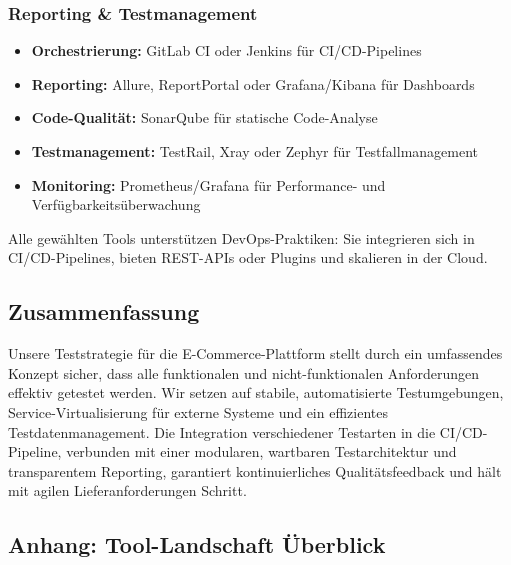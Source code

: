 \subsubsection{Reporting \& Testmanagement}
\begin{itemize}
    \item \textbf{Orchestrierung:} GitLab CI oder Jenkins für CI/CD-Pipelines
    \item \textbf{Reporting:} Allure, ReportPortal oder Grafana/Kibana für Dashboards
    \item \textbf{Code-Qualität:} SonarQube für statische Code-Analyse
    \item \textbf{Testmanagement:} TestRail, Xray oder Zephyr für Testfallmanagement
    \item \textbf{Monitoring:} Prometheus/Grafana für Performance- und Verfügbarkeitsüberwachung
\end{itemize}

Alle gewählten Tools unterstützen DevOps-Praktiken: Sie integrieren sich in CI/CD-Pipelines,
bieten REST-APIs oder Plugins und skalieren in der Cloud.

\subsection{Zusammenfassung}
Unsere Teststrategie für die E-Commerce-Plattform stellt durch ein umfassendes Konzept sicher,
dass alle funktionalen und nicht-funktionalen Anforderungen effektiv getestet werden.
Wir setzen auf stabile, automatisierte Testumgebungen, Service-Virtualisierung für externe Systeme
und ein effizientes Testdatenmanagement. Die Integration verschiedener Testarten in die
CI/CD-Pipeline, verbunden mit einer modularen, wartbaren Testarchitektur und transparentem
Reporting, garantiert kontinuierliches Qualitätsfeedback und hält mit agilen Lieferanforderungen
Schritt.

\subsection{Anhang: Tool-Landschaft Überblick}

